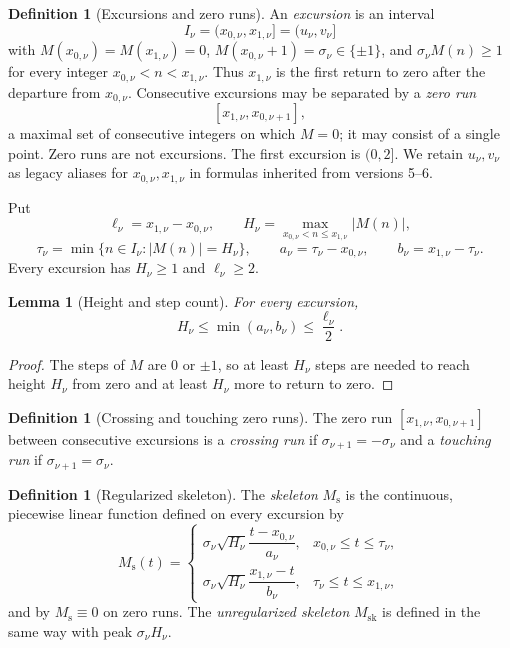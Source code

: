 \documentclass[11pt]{amsart}
\numberwithin{equation}{section}
\theoremstyle{plain}
\newtheorem{lemma}[theorem]{Lemma}
\theoremstyle{definition}
\newtheorem{definition}[theorem]{Definition}
\theoremstyle{remark}
\newcommand{\Ms}{M_{\mathrm{s}}}
\newcommand{\Msk}{M_{\mathrm{sk}}}
\begin{document}
\begin{definition}[Excursions and zero runs]
\label{def:excursion}
An \emph{excursion} is an interval
\[
I_\nu=(x_{0,\nu},x_{1,\nu}]=(u_\nu,v_\nu]
\]
with $M(x_{0,\nu})=M(x_{1,\nu})=0$,
$M(x_{0,\nu}+1)=\sigma_\nu\in\{\pm1\}$, and
$\sigma_\nu M(n)\ge1$ for every integer
$x_{0,\nu}<n<x_{1,\nu}$. Thus $x_{1,\nu}$ is the first return to zero after
the departure from $x_{0,\nu}$. Consecutive excursions may be separated by
a \emph{zero run}
\[
[x_{1,\nu},x_{0,\nu+1}],
\]
a maximal set of consecutive integers on which $M=0$; it may consist of a
single point. Zero runs are not excursions. The first excursion is $(0,2]$.
We retain $u_\nu,v_\nu$ as legacy aliases for $x_{0,\nu},x_{1,\nu}$ in
formulas inherited from versions 5--6.

Put
\[
\ell_\nu=x_{1,\nu}-x_{0,\nu},\qquad
H_\nu=\max_{x_{0,\nu}<n\le x_{1,\nu}}|M(n)|,
\]
\[
\tau_\nu=\min\{n\in I_\nu:|M(n)|=H_\nu\},\qquad
a_\nu=\tau_\nu-x_{0,\nu},\qquad b_\nu=x_{1,\nu}-\tau_\nu.
\]
Every excursion has $H_\nu\ge1$ and $\ell_\nu\ge2$.
\end{definition}

\begin{lemma}[Height and step count]
\label{lem:height_steps}
For every excursion,
\begin{equation}
\label{eq:height_steps}
H_\nu\le\min(a_\nu,b_\nu)\le\frac{\ell_\nu}{2}.
\end{equation}
\end{lemma}

\begin{proof}
The steps of $M$ are $0$ or $\pm1$, so at least $H_\nu$ steps are needed to
reach height $H_\nu$ from zero and at least $H_\nu$ more to return to zero.
\end{proof}

\begin{definition}[Crossing and touching zero runs]
\label{def:crossing_touching}
The zero run $[x_{1,\nu},x_{0,\nu+1}]$ between consecutive excursions is a
\emph{crossing run} if $\sigma_{\nu+1}=-\sigma_\nu$ and a \emph{touching run}
if $\sigma_{\nu+1}=\sigma_\nu$.
\end{definition}

\begin{definition}[Regularized skeleton]
\label{def:Ms}
The \emph{skeleton} $\Ms$ is the continuous, piecewise linear function
defined on every excursion by
\begin{equation}
\label{eq:Ms_def}
\Ms(t)=
\begin{cases}
\sigma_\nu\sqrt{H_\nu}\dfrac{t-x_{0,\nu}}{a_\nu},
 &x_{0,\nu}\le t\le\tau_\nu,\\[2ex]
\sigma_\nu\sqrt{H_\nu}\dfrac{x_{1,\nu}-t}{b_\nu},
 &\tau_\nu\le t\le x_{1,\nu},
\end{cases}
\end{equation}
and by $\Ms\equiv0$ on zero runs.  The \emph{unregularized skeleton} $\Msk$
is defined in the same way with peak $\sigma_\nu H_\nu$.
\end{definition}
\end{document}
